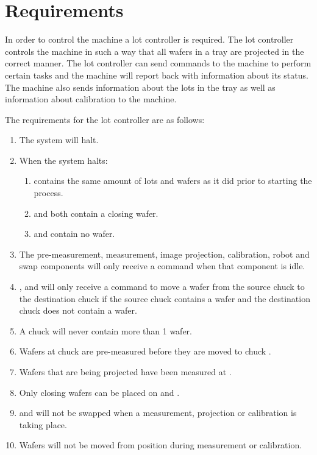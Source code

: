 \section{Requirements}
In order to control the machine a lot controller is required.
The lot controller controls the machine in such a way that all wafers in a tray are projected in the correct manner.
The lot controller can send commands to the machine to perform certain tasks and the machine will report back with information about its status.
The machine also sends information about the lots in the tray as well as information about calibration to the machine. 

The requirements for the lot controller are as follows:
\begin{enumerate}
    \item The system will halt.
    \item When the system halts:
        \begin{enumerate}
            \item \tray contains the same amount of lots and wafers as it did prior to starting the process.
            \item \chuckMeas and \chuckProj both contain a closing wafer.
            \item \chuckIn and \chuckOut contain no wafer.
        \end{enumerate}
    \item The pre-measurement, measurement, image projection, calibration, robot and swap components will only receive a command when that component is idle.
    \item \robotOne, \robotTwo and \robotThree will only receive a command to move a wafer from the source chuck to the destination chuck if the source chuck contains a wafer and the destination chuck does not contain a wafer.
    \item A chuck will never contain more than 1 wafer.
    \item Wafers at chuck \chuckIn are pre-measured before they are moved to chuck \chuckMeas.
    \item Wafers that are being projected have been measured at \chuckMeas.
    \item Only closing wafers can be placed on \chuckEmptyOne and \chuckEmptyTwo.
    \item \chuckMeas and \chuckProj will not be swapped when a measurement, projection or calibration is taking place.
    \item Wafers will not be moved from \chuckMeas position during measurement or calibration.

\end{enumerate}
